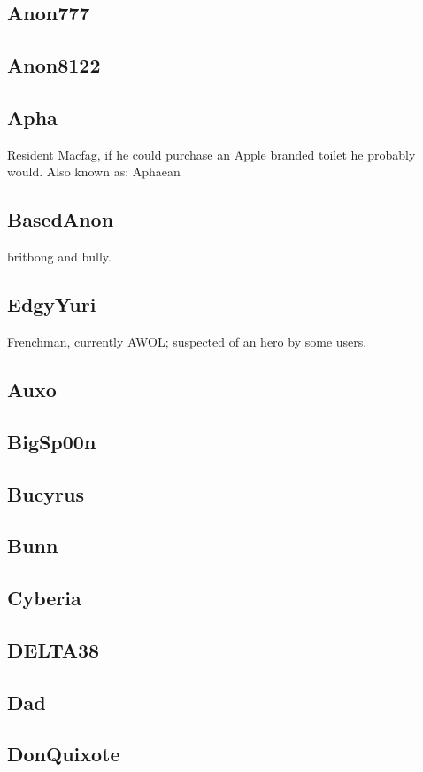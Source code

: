\documentclass[12pt]{report}
\begin{document}
{\subsection{Anon777}

\subsection{Anon8122}

\subsection{Apha}
Resident Macfag, if he could purchase an Apple branded toilet he probably would. 
Also known as: Aphaean

\subsection{BasedAnon}
britbong and bully. 

\subsection{EdgyYuri}
Frenchman, currently AWOL; suspected of an hero by some users.

\subsection{Auxo}
\subsection{BigSp00n}
\subsection{Bucyrus}
\subsection{Bunn}
\subsection{Cyberia}
\subsection{DELTA38}
\subsection{Dad}
\subsection{DonQuixote}
}
\end{document}
